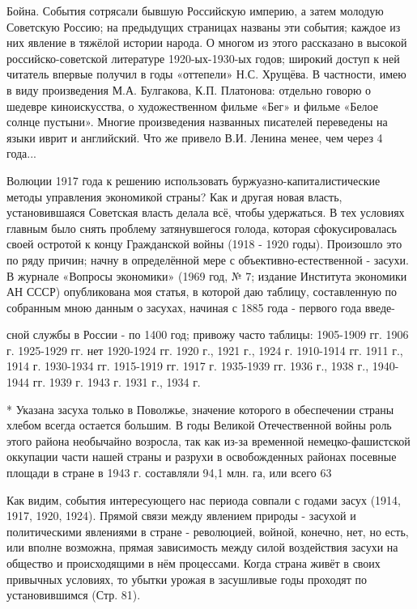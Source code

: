 Бойна. События сотрясали бывшую Российскую империю, а затем молодую Советскую Россию; на предыдущих страницах названы эти события; каждое из них явление в тяжёлой истории народа. О многом из этого рассказано в высокой российско-советской литературе 1920-ых-1930-ых годов; широкий доступ к ней читатель впервые получил в годы «оттепели» Н.С. Хрущёва. В частности, имею в виду произведения М.А. Булгакова, К.П. Платонова: отдельно говорю о шедевре киноискусства, о художественном фильме «Бег» и фильме «Белое солнце пустыни». Многие произведения названных писателей переведены на языки иврит и английский. Что же привело В.И. Ленина менее, чем через 4 года...

Волюции 1917 года к решению использовать буржуазно-капиталистические методы управления экономикой страны? Как и другая новая власть, установившаяся Советская власть делала всё, чтобы удержаться. В тех условиях главным было снять проблему затянувшегося голода, которая сфокусировалась своей остротой к концу Гражданской войны (1918 - 1920 годы). Произошло это по ряду причин; начну в определённой мере с объективно-естественной - засухи. В журнале «Вопросы экономики» (1969 год, № 7; издание Института экономики АН СССР) опубликована моя статья, в которой даю таблицу, составленную по собранным мною данным о засухах, начиная с 1885 года - первого года введе-

сной службы в России - по 1400 год; привожу часто таблицы: 1905-1909 гг. 1906 г. 1925-1929 гг. нет 1920-1924 гг. 1920 г., 1921 г., 1924 г. 1910-1914 гг. 1911 г., 1914 г. 1930-1934 гг. 1915-1919 гг. 1917 г. 1935-1939 гг. 1936 г., 1938 г., 1940-1944 гг. 1939 г. 1943 г. 1931 г., 1934 г.

* Указана засуха только в Поволжье, значение которого в обеспечении страны хлебом всегда остается большим. В годы Великой Отечественной войны роль этого района необычайно возросла, так как из-за временной немецко-фашистской оккупации части нашей страны и разрухи в освобожденных районах посевные площади в стране в 1943 г. составляли 94,1 млн. га, или всего 63%

Как видим, события интересующего нас периода совпали с годами засух (1914, 1917, 1920, 1924). Прямой связи между явлением природы - засухой и политическими явлениями в стране - революцией, войной, конечно, нет, но есть, или вполне возможна, прямая зависимость между силой воздействия засухи на общество и происходящими в нём процессами. Когда страна живёт в своих привычных условиях, то убытки урожая в засушливые годы проходят по установившимся (Стр. 81).

